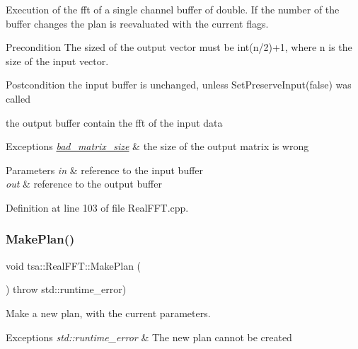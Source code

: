 Execution of the fft of a single channel buffer of double. If the number of the buffer changes the plan is reevaluated with the current flags.

\begin{DoxyPrecond}{Precondition}
The sized of the output vector must be int(n/2)+1, where n is the size of the input vector.
\end{DoxyPrecond}
\begin{DoxyPostcond}{Postcondition}
the input buffer is unchanged, unless Set\+Preserve\+Input(false) was called 

the output buffer contain the fft of the input data
\end{DoxyPostcond}

\begin{DoxyExceptions}{Exceptions}
{\em \hyperlink{classtsa_1_1bad__matrix__size}{bad\+\_\+matrix\+\_\+size}} & the size of the output matrix is wrong \\
\hline
\end{DoxyExceptions}

\begin{DoxyParams}{Parameters}
{\em in} & reference to the input buffer \\
\hline
{\em out} & reference to the output buffer \\
\hline
\end{DoxyParams}


Definition at line 103 of file Real\+F\+F\+T.\+cpp.

\mbox{\label{classtsa_1_1_real_f_f_t_a6684b1abf6f9de2d7c546c3556ef0a0e}} 
\subsubsection{\texorpdfstring{Make\+Plan()}{MakePlan()}}
{\footnotesize\ttfamily void tsa\+::\+Real\+F\+F\+T\+::\+Make\+Plan (\begin{DoxyParamCaption}{ }\end{DoxyParamCaption}) throw  std\+::runtime\+\_\+error) \hspace{0.3cm}{\ttfamily [virtual]}}

Make a new plan, with the current parameters.


\begin{DoxyExceptions}{Exceptions}
{\em std\+::runtime\+\_\+error} & The new plan cannot be created \\
\hline
\end{DoxyExceptions}


